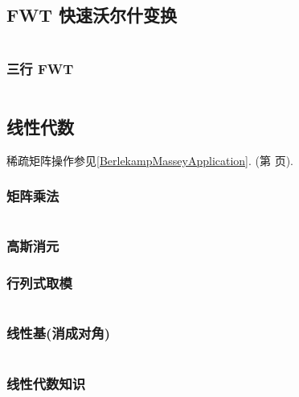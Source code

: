 \documentclass[a4paper, twoside]{article}
\begin{document}
\begin{multicols}{2}

			\subsection{FWT 快速沃尔什变换}
				\inputminted{cpp}{../src/math/FWT.cpp}

				\subsubsection{三行 FWT}
					\inputminted{cpp}{../src/math/fwt3.cpp}

			\subsection{线性代数}
				稀疏矩阵操作参见\ref{BerlekampMasseyApplication}. (第 \pageref{BerlekampMasseyApplication}页).

				\subsubsection{矩阵乘法}
					\inputminted{cpp}{../src/math/矩阵乘法.cpp}

				\subsubsection{高斯消元}
					

				\subsubsection{行列式取模}
					\inputminted{cpp}{../src/math/行列式取模.cpp}



				\subsubsection{线性基(消成对角)}
					\inputminted{cpp}{../src/math/线性基.cpp}

				\subsubsection{线性代数知识}
					
				

\end{multicols}
\end{document}
